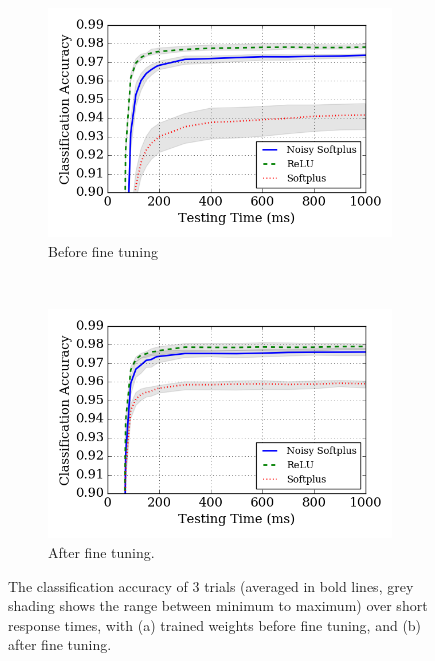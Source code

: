 	\begin{figure}[htb!]
		\centering
		\DIFdelbeginFL %
\DIFdelendFL \DIFaddbeginFL \begin{subfigure}[t]{0.7\textwidth}
			\includegraphics[width=\textwidth]{pics_iconip/revise_8-2.png}
			\DIFaddendFL \caption{Before fine tuning}
		\end{subfigure}\DIFdelbeginFL %
\DIFdelendFL \DIFaddbeginFL \\
		\begin{subfigure}[t]{0.7\textwidth}
			\includegraphics[width=\textwidth]{pics_iconip/revise_8-3.png}
			\DIFaddendFL \caption{After fine tuning.}
		\end{subfigure}

		\caption[The classification accuracy after fine tuning.]{The classification accuracy of 3 trials (averaged in bold lines, grey shading shows the range between minimum to maximum) over short response times, with (a) trained weights before fine tuning, and (b) after fine tuning.}
		\label{fig:ca_time}	
	\end{figure}

